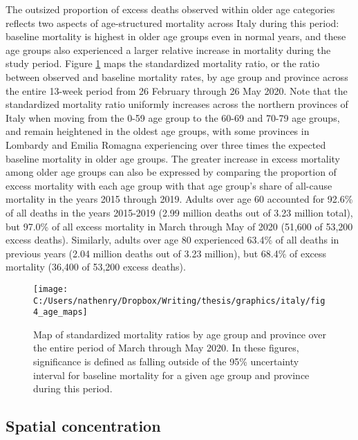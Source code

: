 \documentclass[
]{article}
\begin{document}
The outsized proportion of excess deaths observed within older age categories reflects two aspects of age-structured mortality across Italy during this period: baseline mortality is highest in older age groups even in normal years, and these age groups also experienced a larger relative increase in mortality during the study period. Figure \ref{fig:age-maps} maps the standardized mortality ratio, or the ratio between observed and baseline mortality rates, by age group and province across the entire 13-week period from 26 February through 26 May 2020. Note that the standardized mortality ratio uniformly increases across the northern provinces of Italy when moving from the 0-59 age group to the 60-69 and 70-79 age groups, and remain heightened in the oldest age groups, with some provinces in Lombardy and Emilia Romagna experiencing over three times the expected baseline mortality in older age groups. The greater increase in excess mortality among older age groups can also be expressed by comparing the proportion of excess mortality with each age group with that age group's share of all-cause mortality in the years 2015 through 2019. Adults over age 60 accounted for 92.6\% of all deaths in the years 2015-2019 (2.99 million deaths out of 3.23 million total), but 97.0\% of all excess mortality in March through May of 2020 (51,600 of 53,200 excess deaths). Similarly, adults over age 80 experienced 63.4\% of all deaths in previous years (2.04 million deaths out of 3.23 million), but 68.4\% of excess mortality (36,400 of 53,200 excess deaths).

\begin{figure}[!hbt]

{\centering \texttt{[image: C:/Users/nathenry/Dropbox/Writing/thesis/graphics/italy/fig4\_age\_maps]} 

}

\caption{Map of standardized mortality ratios by age group and province over the entire period of March through May 2020. In these figures, significance is defined as falling outside of the 95\% uncertainty interval for baseline mortality for a given age group and province during this period.}\label{fig:age-maps}
\end{figure}

\hypertarget{spatial-concentration}{%
\subsection{Spatial concentration}\label{spatial-concentration}}
\end{document}
